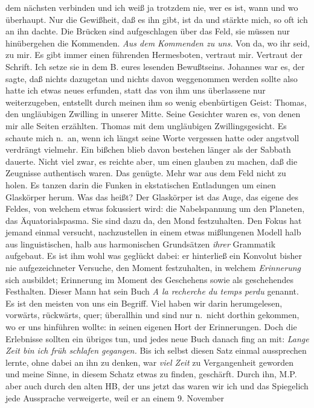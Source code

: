 \documentclass[
]{article}
\begin{document}
dem nächsten verbinden und ich weiß ja trotzdem nie, wer es ist, wann
und wo überhaupt. Nur die Gewißheit, daß es ihn gibt, ist da und stärkte
mich, so oft ich an ihn dachte. Die Brücken sind aufgeschlagen über das
Feld, sie müssen nur hinübergehen die Kommenden. \emph{Aus dem Kommenden
zu uns. }Von da, wo ihr seid, zu mir. Es gibt immer einen führenden
Hermesboten, vertraut mir. Vertraut der Schrift. Ich setze sie in dem B.
eures lesenden Bewußtseins. Johannes war es, der sagte, daß nichts
dazugetan und nichts davon weggenommen werden sollte also hatte ich
etwas neues erfunden, statt das von ihm uns überlassene nur
weiterzugeben, entstellt durch meinen ihm so wenig ebenbürtigen Geist:
Thomas, den ungläubigen Zwilling in unserer Mitte. Seine Gesichter waren
es, von denen mir alle Seiten erzählten. Thomas mit dem ungläubigen
Zwillingsgesicht. Es schaute mich n.~an, wenn ich längst seine Worte
vergessen hatte oder angstvoll verdrängt vielmehr. Ein bißchen blieb
davon bestehen länger als der Sabbath dauerte. Nicht viel zwar, es
reichte aber, um einen glauben zu machen, daß die Zeugnisse authentisch
waren. Das genügte. Mehr war aus dem Feld nicht zu holen. Es tanzen
darin die Funken in ekstatischen Entladungen um einen Glaskörper herum.
Was das heißt? Der Glaskörper ist das Auge, das eigene des Feldes, von
welchem etwas fokussiert wird: die Nabelspannung um den Planeten, das
Äquatorialspasma. Sie sind dazu da, den Mond festzuhalten. Den Fokus hat
jemand einmal versucht, nachzustellen in einem etwas mißlungenen Modell
halb aus linguistischen, halb aus harmonischen Grundsätzen \emph{ihrer}
Grammatik aufgebaut. Es ist ihm wohl was geglückt dabei: er hinterließ
ein Konvolut bisher nie aufgezeichneter Versuche, den Moment
festzuhalten, in welchem \emph{Erinnerung} sich ausbildet; Erinnerung im
Moment des Geschehens sowie als geschehendes Festhalten. Dieser Mann hat
sein Buch \emph{A la recherche du temps perdu} genannt. Es ist den
meisten von uns ein Begriff. Viel haben wir darin herumgelesen,
vorwärts, rückwärts, quer; überallhin und sind nur n.~nicht dorthin
gekommen, wo er uns hinführen wollte: in seinen eigenen Hort der
Erinnerungen. Doch die Erlebnisse sollten ein übriges tun, und jedes
neue Buch danach fing an mit: \emph{Lange Zeit bin ich früh schlafen
gegangen. }Bis ich selbst diesen Satz einmal aussprechen lernte, ohne
dabei an ihn zu denken, war \emph{viel Zeit }zu Vergangenheit geworden
und meine Sinne, in diesem Schatz etwas zu finden, geschärft. Durch ihn,
M.P. aber auch durch den alten HB, der uns jetzt das waren wir ich und
das Spiegelich jede Aussprache verweigerte, weil er an einem 9. November
\end{document}
